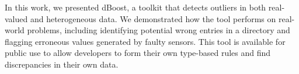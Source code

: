 
In this work, we presented dBoost, a toolkit that detects outliers in both real-valued and heterogeneous data.
We demonstrated how the tool performs on real-world problems, including identifying potential wrong entries in a directory and flagging erroneous values generated by faulty sensors.
This tool is available for public use to allow developers to form their own type-based rules and find discrepancies in their own data.
